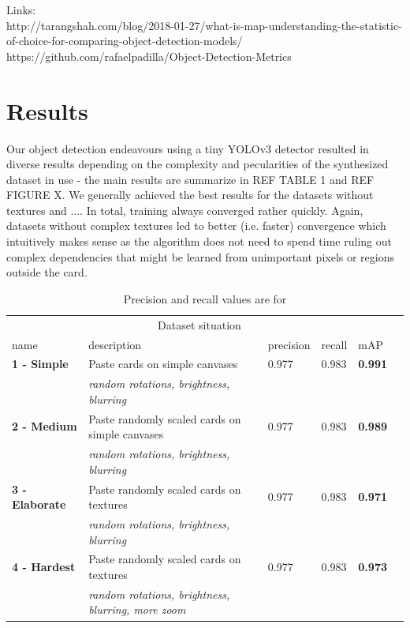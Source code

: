 \documentclass[a4paper]{article}
\begin{document}
Links: \\
http://tarangshah.com/blog/2018-01-27/what-is-map-understanding-the-statistic-of-choice-for-comparing-object-detection-models/
\\
https://github.com/rafaelpadilla/Object-Detection-Metrics\\
\section{Results}
Our object detection endeavours using a tiny YOLOv3 detector resulted in diverse results depending on the complexity and pecularities of the synthesized dataset in use - the main results are summarize in REF TABLE 1 and REF FIGURE X. We generally achieved the best results for the datasets without textures and ....
In total, training always converged rather quickly. Again, datasets without complex textures led to better (i.e. faster) convergence which intuitively makes sense as the algorithm does not need to spend time ruling out complex dependencies that might be learned from unimportant pixels or regions outside the card.\\
\begin{table}[h]

\begin{tabular}{lllllr}
\hline
\multicolumn{5}{c}{Dataset situation} \\
\cline{1-2}
name    & description  & precision & recall & mAP \\
\hline
\textbf{1 - Simple}      & Paste cards on simple canvases    &  0.977  & 0.983 & \textbf{0.991} \\
          & \textit{random rotations, brightness, blurring}     & & & \\
\textbf{2 - Medium}      & Paste randomly scaled cards on simple canvases & 0.977 & 0.983 & \textbf{0.989} \\
          & \textit{random rotations, brightness, blurring}     & & & \\
\textbf{3 - Elaborate}       & Paste randomly scaled cards on textures & 0.977 & 0.983 & \textbf{0.971} \\
          & \textit{random rotations, brightness, blurring}     & & & \\
\textbf{4 - Hardest} & Paste randomly scaled cards on textures & 0.977 & 0.983 & \textbf{0.973} \\
          & \textit{random rotations, brightness, blurring, more zoom}     & & & \\
\hline


\end{tabular}
\caption{Precision and recall values are for } 
\end{table}
\end{document}
